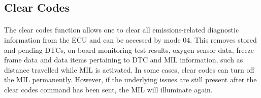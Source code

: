 	\subsection{Clear Codes}{
		\paragraph{}{
		The clear codes function allows one to clear all emissions-related diagnostic information from the ECU and can be accessed by mode 04. This removes stored and pending DTCs, on-board monitoring test results, oxygen sensor data, freeze frame data and data items pertaining to DTC and MIL information, such as distance travelled while MIL is activated. In some cases, clear codes can turn off the MIL permanently. However, if the underlying issues are still present after the clear codes command has been sent, the MIL will illuminate again.
		}
	}
	\label{ssec:ClearCodes}
	
